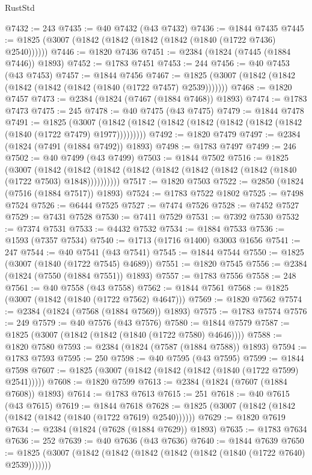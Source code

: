 \begin{lexlean}{RustStd}
\begin{coremodule}
@7432 := 243
@7435 := @40 @7432 (@43 @7432)
@7436 := @1844 @7435
@7445 := @1825 (@3007 (@1842 (@1842 (@1842 (@1842 (@1840 (@1722 @7436) @2540))))))
@7446 := @1820 @7436
@7451 := @2384 (@1824 (@7445 (@1884 @7446)) @1893)
@7452 := @1783 @7451
@7453 := 244
@7456 := @40 @7453 (@43 @7453)
@7457 := @1844 @7456
@7467 := @1825 (@3007 (@1842 (@1842 (@1842 (@1842 (@1842 (@1840 (@1722 @7457) @2539)))))))
@7468 := @1820 @7457
@7473 := @2384 (@1824 (@7467 (@1884 @7468)) @1893)
@7474 := @1783 @7473
@7475 := 245
@7478 := @40 @7475 (@43 @7475)
@7479 := @1844 @7478
@7491 := @1825
    (@3007 (@1842 (@1842 (@1842 (@1842 (@1842 (@1842 (@1842 (@1840 (@1722 @7479) @1977)))))))))
@7492 := @1820 @7479
@7497 := @2384 (@1824 (@7491 (@1884 @7492)) @1893)
@7498 := @1783 @7497
@7499 := 246
@7502 := @40 @7499 (@43 @7499)
@7503 := @1844 @7502
@7516 := @1825
    (@3007
      (@1842 (@1842 (@1842 (@1842 (@1842 (@1842 (@1842 (@1842 (@1840 (@1722 @7503) @1848))))))))))
@7517 := @1820 @7503
@7522 := @2850 (@1824 (@7516 (@1884 @7517)) @1893)
@7524 := @1783 @7522 @1802
@7525 := @7498 @7524
@7526 := @6444 @7525
@7527 := @7474 @7526
@7528 := @7452 @7527
@7529 := @7431 @7528
@7530 := @7411 @7529
@7531 := @7392 @7530
@7532 := @7374 @7531
@7533 := @4432 @7532
@7534 := @1884 @7533
@7536 := @1593 (@7357 @7534)
@7540 := @1713 (@1716 @1400) @3003 @1656
@7541 := 247
@7544 := @40 @7541 (@43 @7541)
@7545 := @1844 @7544
@7550 := @1825 (@3007 (@1840 (@1722 @7545) @4689))
@7551 := @1820 @7545
@7556 := @2384 (@1824 (@7550 (@1884 @7551)) @1893)
@7557 := @1783 @7556
@7558 := 248
@7561 := @40 @7558 (@43 @7558)
@7562 := @1844 @7561
@7568 := @1825 (@3007 (@1842 (@1840 (@1722 @7562) @4647)))
@7569 := @1820 @7562
@7574 := @2384 (@1824 (@7568 (@1884 @7569)) @1893)
@7575 := @1783 @7574
@7576 := 249
@7579 := @40 @7576 (@43 @7576)
@7580 := @1844 @7579
@7587 := @1825 (@3007 (@1842 (@1842 (@1840 (@1722 @7580) @4646))))
@7588 := @1820 @7580
@7593 := @2384 (@1824 (@7587 (@1884 @7588)) @1893)
@7594 := @1783 @7593
@7595 := 250
@7598 := @40 @7595 (@43 @7595)
@7599 := @1844 @7598
@7607 := @1825 (@3007 (@1842 (@1842 (@1842 (@1840 (@1722 @7599) @2541)))))
@7608 := @1820 @7599
@7613 := @2384 (@1824 (@7607 (@1884 @7608)) @1893)
@7614 := @1783 @7613
@7615 := 251
@7618 := @40 @7615 (@43 @7615)
@7619 := @1844 @7618
@7628 := @1825 (@3007 (@1842 (@1842 (@1842 (@1842 (@1840 (@1722 @7619) @2540))))))
@7629 := @1820 @7619
@7634 := @2384 (@1824 (@7628 (@1884 @7629)) @1893)
@7635 := @1783 @7634
@7636 := 252
@7639 := @40 @7636 (@43 @7636)
@7640 := @1844 @7639
@7650 := @1825 (@3007 (@1842 (@1842 (@1842 (@1842 (@1842 (@1840 (@1722 @7640) @2539)))))))

\end{coremodule}
\end{lexlean}
